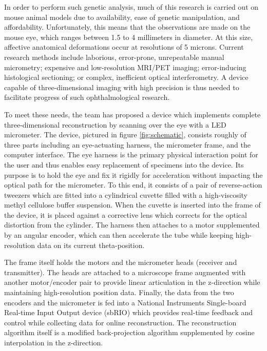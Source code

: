 \documentclass{article}
\begin{document}
In order to perform such genetic analysis, much of this research is carried out on mouse animal models due to availability, ease of genetic manipulation, and affordability\cite{schaeffel04}. Unfortunately, this means that the observations are made on the mouse eye, which ranges between 1.5 to 4 millimeters in diameter. At this size, affective anatomical deformations occur at resolutions of 5 microns. Current research methods include laborious, error-prone, unrepeatable manual micrometry\cite{wallman04}; expensive and low-resolution MRI/PET imaging\cite{atchison04}; error-inducing histological sectioning\cite{schaeffel04}; or complex, inefficient optical interferometry\cite{guggenheim04,schaeffel04}. A device capable of three-dimensional imaging with high precision is thus needed to facilitate progress of such ophthalmological research.
 
To meet these needs, the team has proposed a device which implements complete three-dimensional reconstruction by scanning over the eye with a LED micrometer. The device, pictured in figure \ref{fig:schematic}, consists roughly of three parts including an eye-actuating harness, the micrometer frame, and the computer interface. The eye harness is the primary physical interaction point for the user and thus enables easy replacement of specimens into the device. Its purpose is to hold the eye and fix it rigidly for acceleration without impacting the optical path for the micrometer. To this end, it consists of a pair of reverse-action tweezers which are fitted into a cylindrical cuvette filled with a high-viscosity methyl cellulose buffer suspension. When the cuvette is inserted into the frame of the device, it is placed against a corrective lens which corrects for the optical distortion from the cylinder. The harness then attaches to a motor supplemented by an angular encoder, which can then accelerate the tube while keeping high-resolution data on its current theta-position.
 
The frame itself holds the motors and the micrometer heads (receiver and transmitter). The heads are attached to a microscope frame augmented with another motor/encoder pair to provide linear articulation in the z-direction while maintaining high-resolution position data. Finally, the data from the two encoders and the micrometer is fed into a National Instruments Single-board Real-time Input Output device (sbRIO) which provides real-time feedback and control while collecting data for online reconstruction. The reconstruction algorithm itself is a modified back-projection algorithm supplemented by cosine interpolation in the z-direction.
 
\end{document}
